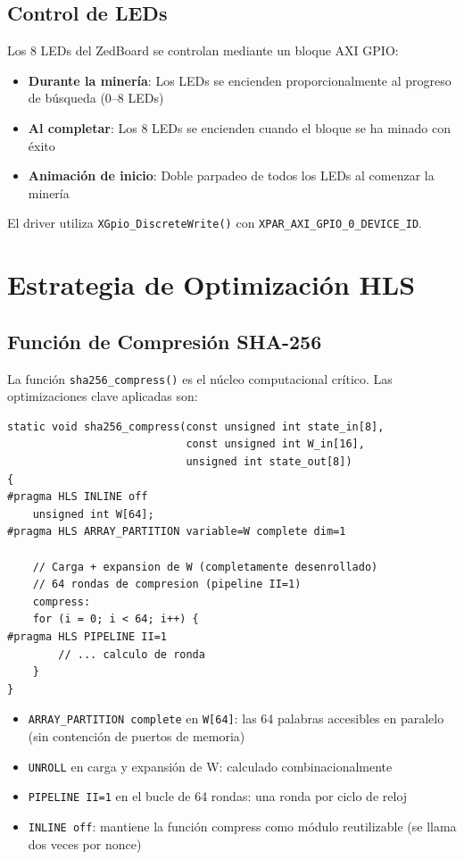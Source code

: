 \documentclass[12pt,a4paper]{article}
\begin{document}
\subsection{Control de LEDs}

Los 8 LEDs del ZedBoard se controlan mediante un bloque AXI GPIO:
\begin{itemize}[leftmargin=2em]
    \item \textbf{Durante la miner\'ia}: Los LEDs se encienden proporcionalmente al progreso de b\'usqueda (0--8 LEDs)
    \item \textbf{Al completar}: Los 8 LEDs se encienden cuando el bloque se ha minado con \'exito
    \item \textbf{Animaci\'on de inicio}: Doble parpadeo de todos los LEDs al comenzar la miner\'ia
\end{itemize}

El driver utiliza \texttt{XGpio\_DiscreteWrite()} con \texttt{XPAR\_AXI\_GPIO\_0\_DEVICE\_ID}.

\section{Estrategia de Optimizaci\'on HLS}

\subsection{Funci\'on de Compresi\'on SHA-256}

La funci\'on \texttt{sha256\_compress()} es el n\'ucleo computacional cr\'itico.
Las optimizaciones clave aplicadas son:

\begin{lstlisting}[style=cstyle]
static void sha256_compress(const unsigned int state_in[8],
                            const unsigned int W_in[16],
                            unsigned int state_out[8])
{
#pragma HLS INLINE off
    unsigned int W[64];
#pragma HLS ARRAY_PARTITION variable=W complete dim=1

    // Carga + expansion de W (completamente desenrollado)
    // 64 rondas de compresion (pipeline II=1)
    compress:
    for (i = 0; i < 64; i++) {
#pragma HLS PIPELINE II=1
        // ... calculo de ronda
    }
}
\end{lstlisting}

\begin{itemize}[leftmargin=2em]
    \item \texttt{ARRAY\_PARTITION complete} en \texttt{W[64]}: las 64 palabras accesibles en paralelo (sin contenci\'on de puertos de memoria)
    \item \texttt{UNROLL} en carga y expansi\'on de W: calculado combinacionalmente
    \item \texttt{PIPELINE II=1} en el bucle de 64 rondas: una ronda por ciclo de reloj
    \item \texttt{INLINE off}: mantiene la funci\'on compress como m\'odulo reutilizable (se llama dos veces por nonce)
\end{itemize}
\end{document}
